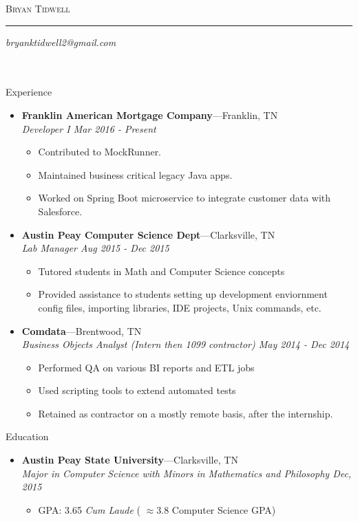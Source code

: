 \documentclass[11pt,oneside]{article}
\makeatletter
\newcommand{\name}{Bryan Tidwell}
\newcommand{\email}{bryanktidwell2@gmail.com}
\newcommand{\bigname}[1]{
	\begin{center}\fontfamily{phv}\selectfont\Huge\scshape#1\end{center}
}
\newenvironment{ressection}[1]{
	\vspace{4pt}
	{\fontfamily{phv}\selectfont\Large#1}
	\begin{itemize}
	\vspace{3pt}
}{
	\end{itemize}
}
\newcommand{\ressubitem}[1]{
	\vspace{-1pt}
	\item \begin{flushleft} #1 \end{flushleft}
}
\newcommand{\resbigitem}[3]{
	\vspace{-5pt}
	\item
	\textbf{#1}---#2 \\
	\textit{#3}
}
\newenvironment{ressubsec}[3]{
	\resbigitem{#1}{#2}{#3}
	\vspace{-2pt}
	\begin{itemize}
}{
	\end{itemize}
}
\makeatother
\begin{document}
 \selectfont

\bigname{\name}

\vspace{-8pt} \rule{\textwidth}{1pt}

\vspace{-1pt} {\small\itshape \hfill \email} \\ \\
 \\
\vspace{8 pt}

\begin{ressection}{Experience}

	\begin{ressubsec}{Franklin American Mortgage Company}{Franklin, TN}{Developer I Mar 2016 - Present}
		\ressubitem{Contributed to MockRunner.}
		\ressubitem{Maintained business critical legacy Java apps.}
		\ressubitem{Worked on Spring Boot microservice to integrate customer data with Salesforce.}
	\end{ressubsec}


	\begin{ressubsec}{Austin Peay Computer Science Dept}{Clarksville, TN}{Lab Manager Aug 2015 - Dec 2015}
		\ressubitem{Tutored students in Math and Computer Science concepts}
		\ressubitem{Provided assistance to students setting up development enviornment config files, importing libraries, IDE projects, Unix commands, etc.}
	\end{ressubsec}

	\begin{ressubsec}{Comdata}{Brentwood, TN}{Business Objects Analyst (Intern then 1099 contractor) May 2014 - Dec 2014}
		\ressubitem{Performed QA on various BI reports and ETL jobs}
    \ressubitem{Used scripting tools to extend automated tests}
    \ressubitem{Retained as contractor on a mostly remote basis, after the internship.}
	\end{ressubsec}

\end{ressection}

\begin{ressection}{Education}

	\begin{ressubsec}{Austin Peay State University}{Clarksville, TN}{Major in Computer Science with Minors in Mathematics and Philosophy Dec, 2015}
		\ressubitem{GPA: 3.65 \textit{Cum Laude} ( $\approx 3.8$ Computer Science GPA)}
	\end{ressubsec}
\end{ressection}
\end{document}
